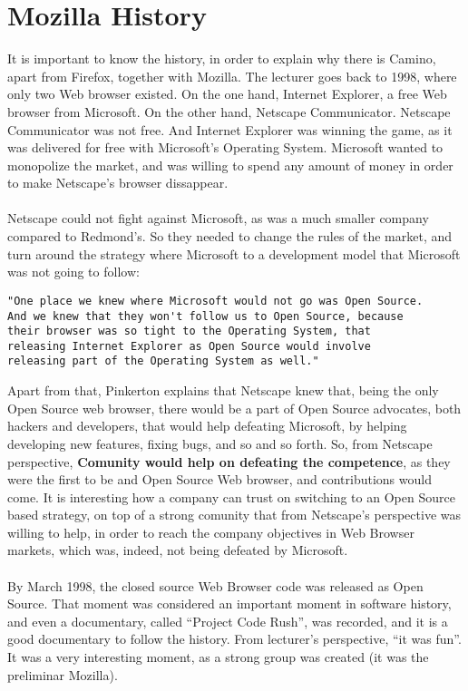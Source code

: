 \documentclass[11pt]{article}
\begin{document}
\section{Mozilla History}
It is important to know the history, in order to explain why there is Camino, apart from Firefox, together with Mozilla. The lecturer goes back to 1998, where only two Web browser existed. On the one hand, Internet Explorer, a free Web browser from Microsoft. On the other hand, Netscape Communicator. Netscape Communicator was not free. And Internet Explorer was winning the game, as it was delivered for free with Microsoft's Operating System. Microsoft wanted to monopolize the market, and was willing to spend any amount of money in order to make Netscape's browser dissappear.\\
\\
Netscape could not fight against Microsoft, as was a much smaller company compared to Redmond's. So they needed to change the rules of the market, and turn around the strategy where Microsoft to a development model that Microsoft was not going to follow:
\begin{verbatim}
"One place we knew where Microsoft would not go was Open Source.
And we knew that they won't follow us to Open Source, because
their browser was so tight to the Operating System, that
releasing Internet Explorer as Open Source would involve
releasing part of the Operating System as well."
\end{verbatim}
Apart from that, Pinkerton explains that Netscape knew that, being the only Open Source web browser, there would be a part of Open Source advocates, both hackers and developers, that would help defeating Microsoft, by helping developing new features, fixing bugs, and so and so forth. So, from Netscape perspective, \textbf{Comunity would help on defeating the competence}, as they were the first to be and Open Source Web browser, and contributions would come. It is interesting how a company can trust on switching to an Open Source based strategy, on top of a strong comunity that from Netscape's perspective was willing to help, in order to reach the company objectives in Web Browser markets, which was, indeed, not being defeated by Microsoft.\\
\\
By March 1998, the closed source Web Browser code was released as Open Source. That moment was considered an important moment in software history, and even a documentary, called ``Project Code Rush'', was recorded, and it is a good documentary to follow the history. From lecturer's perspective, ``it was fun''. It was a very interesting moment, as a strong group was created (it was the preliminar Mozilla).\\
\end{document}
